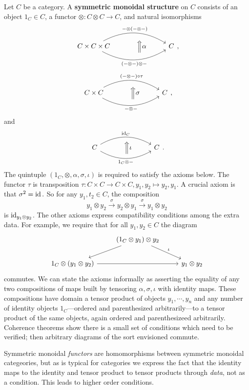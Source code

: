 \begin{definition}[]
    Let $C$ be a category. A \textbf{symmetric monoidal structure} on $C$ consists of an object $1_C \in C$, a functor $\otimes \colon C \otimes C \to C$, and natural isomorphisms \[
    \begin{tikzcd}
        C\times C\times C\arrow[rr, "-\otimes(-\otimes -)", bend left] \arrow[rr, "(-\otimes -)\otimes -"', bend right] & \,\,~ \Big\Uparrow\alpha  & C
\end{tikzcd},
    \] \[
        \begin{tikzcd}
        C\times C\arrow[rr, "(-\otimes -)\circ \tau", bend left] \arrow[rr, "-\otimes -"', bend right] & \,\,~ \Big\Uparrow\sigma  & C
\end{tikzcd},
    \] and \[
        \begin{tikzcd}
        C\arrow[rr, "\id_C", bend left] \arrow[rr, "1_C \otimes -"', bend right] & \,\,~ \Big\Uparrow\iota  & C
\end{tikzcd}.
    \] The quintuple $(1_C, \otimes, \alpha ,\sigma,\iota)$ is required to satisfy the axioms below. The functor $\tau$ is transposition $\tau \colon C \times C \to C\times C, y_1,y_2 \mapsto y_2,y_1$. A crucial axiom is that $\sigma^2=\operatorname{id}.$ So for any $y_1,t_2 \in C$, the composition \[
    y_1 \otimes y_2 \xrightarrow{\sigma} y_2 \otimes y_1 \xrightarrow{\sigma} y_1 \otimes y_2
    \] is $\operatorname{id} _{y_1 \otimes y_2}$. The other axioms express compatibility conditions among the extra data. For example, we require that for all $y_1,y_2 \in C$ the diagram
    \[
    \begin{tikzcd}
                                        & (1_C \otimes y_1)\otimes y_2 \arrow[ld] \arrow[rd, "\iota"] &                \\
1_C \otimes (y_1\otimes y_2) \arrow[rr] &                                                             & y_1\otimes y_2
\end{tikzcd}
    \] commutes. We can state the axioms informally as asserting the equality of any two compositions of maps built by tensoring $\alpha ,\sigma,\iota$ with identity maps. These compositions have domain a tensor product of objects $y_1, \cdots ,y_n $ and any number of identity objects $1_C$---ordered and parenthesized arbitrarily---to a tensor product of the same objects, again ordered and parenthesizeed arbitrarily. Coherence theorems show there is a small set of conditions which need to be verified; then arbitrary diagrams of the sort envisioned commute.
\end{definition}
Symmetric monoidal \emph{functors} are homomorphisms between symmetric monoidal categeories, but as is typical for categories we express the fact that the identity maps to the identity and tensor product to tensor products through \emph{data}, not as a condition. This leads to higher order conditions.

